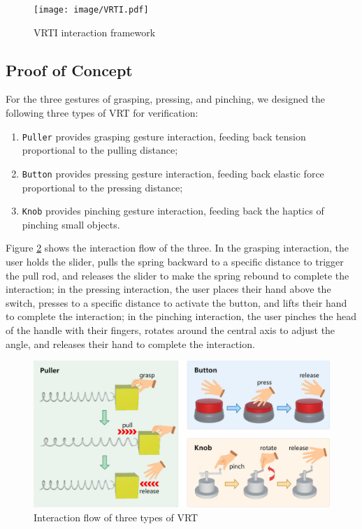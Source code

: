 \documentclass[runningheads]{llncs}
\begin{document}
\begin{figure}[t]
  \centering
  \texttt{[image: image/VRTI.pdf]}
  \caption{VRTI interaction framework}
  \label{fig:VRTI}
\end{figure}

\subsection{Proof of Concept}
For the three gestures of grasping, pressing, and pinching, we designed the following three types of VRT for verification:

\begin{enumerate}[label={\arabic*)}]
  \item \texttt{Puller} provides grasping gesture interaction, feeding back tension proportional to the pulling distance;
  \item \texttt{Button} provides pressing gesture interaction, feeding back elastic force proportional to the pressing distance;
  \item \texttt{Knob} provides pinching gesture interaction, feeding back the haptics of pinching small objects.
\end{enumerate}

Figure \ref{fig:interaction-flow} shows the interaction flow of the three. In the grasping interaction, the user holds the slider, pulls the spring backward to a specific distance to trigger the pull rod, and releases the slider to make the spring rebound to complete the interaction; in the pressing interaction, the user places their hand above the switch, presses to a specific distance to activate the button, and lifts their hand to complete the interaction; in the pinching interaction, the user pinches the head of the handle with their fingers, rotates around the central axis to adjust the angle, and releases their hand to complete the interaction.

\begin{figure}[t]
  \centering
  \includegraphics[width=1\textwidth]{image/Interaction-Flow.pdf}
  \caption{Interaction flow of three types of VRT}
  \label{fig:interaction-flow}
\end{figure}
\end{document}
